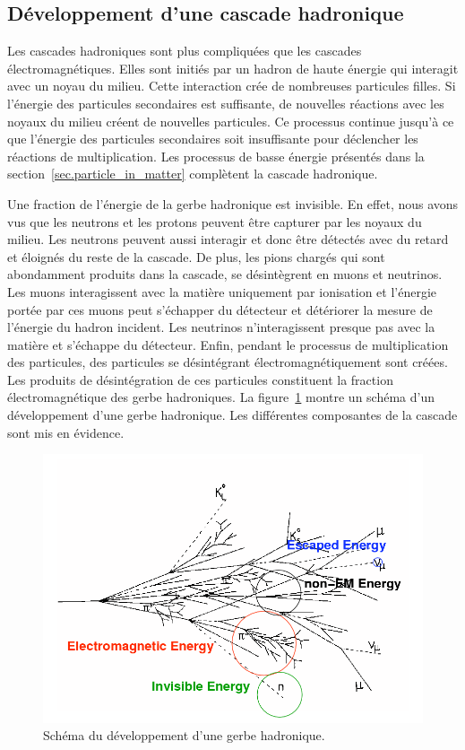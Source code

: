 \subsection{Développement d'une cascade hadronique}
Les cascades hadroniques sont plus compliquées que les cascades électromagnétiques. Elles sont initiés par un hadron de haute énergie qui interagit avec un noyau du milieu. Cette interaction crée de nombreuses particules filles. Si l'énergie des particules secondaires est suffisante, de nouvelles réactions avec les noyaux du milieu créent de nouvelles particules. Ce processus continue jusqu'à ce que l'énergie des particules secondaires soit insuffisante pour déclencher les réactions de multiplication. Les processus de basse énergie présentés dans la section~\ref{sec.particle_in_matter} complètent la cascade hadronique. 

Une fraction de l'énergie de la gerbe hadronique est invisible. En effet, nous avons vus que les neutrons et les protons peuvent être capturer par les noyaux du milieu. Les neutrons peuvent aussi interagir et donc être détectés avec du retard et éloignés du reste de la cascade. De plus, les pions chargés qui sont abondamment produits dans la cascade, se désintègrent en muons et neutrinos. Les muons interagissent avec la matière uniquement par ionisation et l'énergie portée par ces muons peut s'échapper du détecteur et détériorer la mesure de l'énergie du hadron incident. Les neutrinos n'interagissent presque pas avec la matière et s'échappe du détecteur. Enfin, pendant le processus de multiplication des particules, des particules se désintégrant électromagnétiquement sont créées. Les produits de désintégration de ces particules constituent la fraction électromagnétique des gerbe hadroniques. La figure~\ref{fig:hadron_shower} montre un schéma d'un développement d'une gerbe hadronique. Les différentes composantes de la cascade sont mis en évidence.
\begin{figure}[!h]
  \begin{center}
    \includegraphics[width=.7\textwidth]{ShowerTh/figs/had-shower.png}
    \caption{Schéma du développement d'une gerbe hadronique.}
    \label{fig:hadron_shower}
  \end{center}
\end{figure}

